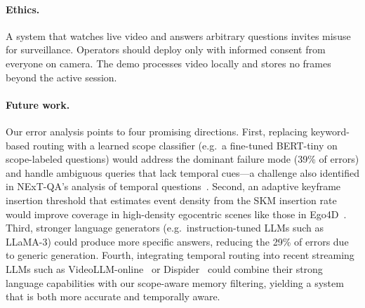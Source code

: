 \paragraph{Ethics.}
A system that watches live video and answers arbitrary questions invites misuse for surveillance. Operators should deploy \ours only with informed consent from everyone on camera. The demo processes video locally and stores no frames beyond the active session.

\paragraph{Future work.}
Our error analysis points to four promising directions.
First, replacing keyword-based routing with a learned scope classifier (e.g.\ a fine-tuned BERT-tiny on scope-labeled questions) would address the dominant failure mode (39\% of errors) and handle ambiguous queries that lack temporal cues---a challenge also identified in NExT-QA's analysis of temporal questions~\cite{xiao2021nextqa}.
Second, an adaptive keyframe insertion threshold that estimates event density from the SKM insertion rate would improve coverage in high-density egocentric scenes like those in Ego4D~\cite{grauman2022ego4d}.
Third, stronger language generators (e.g.\ instruction-tuned LLMs such as LLaMA-3) could produce more specific answers, reducing the 29\% of errors due to generic generation.
Fourth, integrating temporal routing into recent streaming LLMs such as VideoLLM-online~\cite{chen2024videollmonline} or Dispider~\cite{he2024dispider} could combine their strong language capabilities with our scope-aware memory filtering, yielding a system that is both more accurate and temporally aware.
